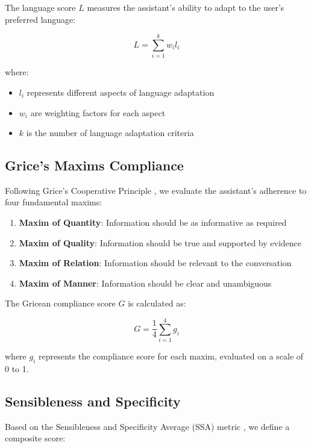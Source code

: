 \documentclass[12pt]{article}
\begin{document}
The language score $L$ measures the assistant's ability to adapt to the user's preferred language:

\begin{equation}
    L = \sum_{i=1}^{k} w_i l_i
\end{equation}

where:
\begin{itemize}
    \item $l_i$ represents different aspects of language adaptation
    \item $w_i$ are weighting factors for each aspect
    \item $k$ is the number of language adaptation criteria
\end{itemize}

\subsection{Grice's Maxims Compliance}

Following Grice's Cooperative Principle \cite{grice1975logic}, we evaluate the assistant's adherence to four fundamental maxims:

\begin{enumerate}
    \item \textbf{Maxim of Quantity}: Information should be as informative as required
    \item \textbf{Maxim of Quality}: Information should be true and supported by evidence
    \item \textbf{Maxim of Relation}: Information should be relevant to the conversation
    \item \textbf{Maxim of Manner}: Information should be clear and unambiguous
\end{enumerate}

The Gricean compliance score $G$ is calculated as:

\begin{equation}
    G = \frac{1}{4}\sum_{i=1}^{4} g_i
\end{equation}

where $g_i$ represents the compliance score for each maxim, evaluated on a scale of 0 to 1.

\subsection{Sensibleness and Specificity}

Based on the Sensibleness and Specificity Average (SSA) metric \cite{adolphs2020evaluation}, we define a composite score:
\end{document}
